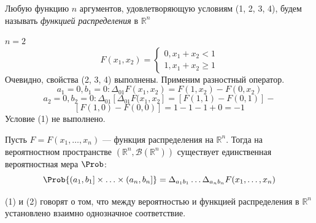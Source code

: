 \begin{definition}
	Любую функцию $n$ аргументов, удовлетворяющую условиям (1, 2, 3, 4), будем называть \textit{функцией распределения} в $\mathbb{R}^n$
\end{definition}
\begin{example}
	$n = 2$ \\
	\[
		F(x_1, x_2) =
		\begin{cases}
			0, x_1 + x_2 < 1 \\
			1, x_1 + x_2 \geqslant 1
		\end{cases}
	\]
	Очевидно, свойства (2, 3, 4) выполнены. Применим разностный оператор.
	\[
		a_1 = 0, b_1 = 0 : \Delta_{0 1} F(x_1, x_2) = F(1,x_2) - F(0, x_2)
	\]
	\[ a_2 = 0, b_2 = 0 : \Delta_{0 1} [\Delta_{0 1} F(x_1, x_2] = [F(1,1) - F(0, 1)] - \]
	\[ [F(1,0) - F(0,0)] = 1 - 1 - 1 + 0 = -1 \]
	Условие (1) не выполнено.
\end{example}
\begin{theorem}
	Пусть $F = F(x_1, \ldots, x_n)$ --- функция распределения на $\mathbb{R}^n$. Тогда на вероятностном пространстве $(\mathbb{R}^n, \mathcal{B}(\mathbb{R}^n))$ существует единственная вероятностная мера $\Prob$:
	\begin{equation}
		\Prob \{ (a_1, b_1] \times \ldots \times (a_n, b_n] \} = \Delta_{a_1 b_1} \dots \Delta_{a_n b_n} F(x_1, \ldots, x_n)
	\end{equation}
\end{theorem}
(1) и (2) говорят о том, что между вероятностью и функцией распределения в $\mathbb{R}^n$ установлено взаимно однозначное соответствие.

